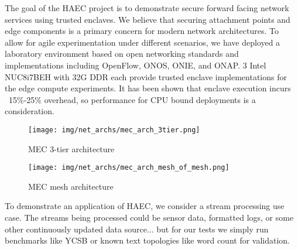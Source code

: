 The goal of the HAEC project is to demonstrate secure forward facing network services using trusted enclaves. We believe\cite{Zaber_Nair_Medamana_Krinos_Cepleanu} that securing attachment points and edge components is a primary concern for modern network architectures. To allow for agile experimentation under different scenarios, we have deployed a laboratory environment based on open networking standards and implementations including OpenFlow, ONOS, ONIE, and ONAP. 3 Intel NUC8i7BEH with 32G DDR each provide trusted enclave implementations for the edge compute experiments. It has been shown\cite{sgx-lkl_2018} that enclave execution incurs ~15\%-25\% overhead, so performance for CPU bound deployments is a consideration. 

\begin{figure}[H]
\centering
\texttt{[image: img/net\_archs/mec\_arch\_3tier.png]}
\caption{MEC 3-tier architecture}
\label{fig:mec_3tier}
\end{figure} 

\begin{figure}[H]
\centering
\texttt{[image: img/net\_archs/mec\_arch\_mesh\_of\_mesh.png]}
\caption{MEC mesh architecture}
\label{fig:mec_mesh}
\end{figure}

To demonstrate an application of HAEC, we consider a stream processing use case. The streams being processed could be sensor data, formatted logs, or some other continuously updated data source... but for our tests we simply run benchmarks like YCSB or known text topologies like word count for validation. 